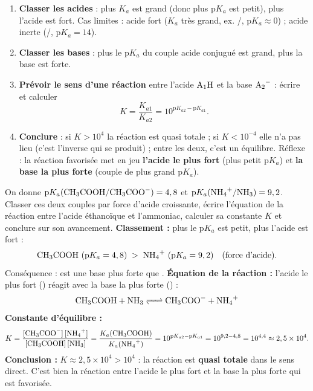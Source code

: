 \documentclass[11pt]{article}
\begin{document}
\begin{methode}
\begin{enumerate}
\item \textbf{Classer les acides} : plus $K_a$ est grand (donc plus $\mathrm{p}K_a$ est petit), plus l'acide est fort. Cas limites : acide fort ($K_a$ très grand, ex. /, $\mathrm{p}K_a \approx 0$) ; acide inerte (/, $\mathrm{p}K_a = 14$).
\item \textbf{Classer les bases} : plus le $\mathrm{p}K_a$ du couple acide conjugué est grand, plus la base est forte.
\item \textbf{Prévoir le sens d'une réaction} entre l'acide $\ce{A1H}$ et la base $\ce{A2-}$ : écrire  et calculer
\[ K = \frac{K_{a1}}{K_{a2}} = 10^{\mathrm{p}K_{a2} - \mathrm{p}K_{a1}}. \]
\item \textbf{Conclure} : si $K > 10^{4}$ la réaction est quasi totale ; si $K < 10^{-4}$ elle n'a pas lieu (c'est l'inverse qui se produit) ; entre les deux, c'est un équilibre. Réflexe : la réaction favorisée met en jeu \textbf{l'acide le plus fort} (plus petit $\mathrm{p}K_a$) et \textbf{la base la plus forte} (couple de plus grand $\mathrm{p}K_a$).
\end{enumerate}
\end{methode}

\begin{exoresolu}
On donne $\mathrm{p}K_a(\ce{CH3COOH}/\ce{CH3COO-}) = 4,8$ et $\mathrm{p}K_a(\ce{NH4+}/\ce{NH3}) = 9,2$. Classer ces deux couples par force d'acide croissante, écrire l'équation de la réaction entre l'acide éthanoïque et l'ammoniac, calculer sa constante $K$ et conclure sur son avancement.
\tcblower
\textbf{Classement :} plus le $\mathrm{p}K_a$ est petit, plus l'acide est fort :
\[ \ce{CH3COOH}\ (\mathrm{p}K_a = 4,8) \;>\; \ce{NH4+}\ (\mathrm{p}K_a = 9,2) \quad \text{(force d'acide)}. \]
Conséquence :  est une base plus forte que .
\textbf{Équation de la réaction :} l'acide le plus fort () réagit avec la base la plus forte () :
\[ \ce{CH3COOH + NH3 <=> CH3COO- + NH4+} \]
\textbf{Constante d'équilibre :}
\[ K = \frac{[\ce{CH3COO-}]\,[\ce{NH4+}]}{[\ce{CH3COOH}]\,[\ce{NH3}]} = \frac{K_a(\ce{CH3COOH})}{K_a(\ce{NH4+})} = 10^{\mathrm{p}K_{a2} - \mathrm{p}K_{a1}} = 10^{9,2 - 4,8} = 10^{4,4} \approx 2,5\times 10^{4}. \]
\textbf{Conclusion :} $K \approx 2,5\times 10^{4} > 10^{4}$ : la réaction est \textbf{quasi totale} dans le sens direct. C'est bien la réaction entre l'acide le plus fort et la base la plus forte qui est favorisée.
\end{exoresolu}
\end{document}
